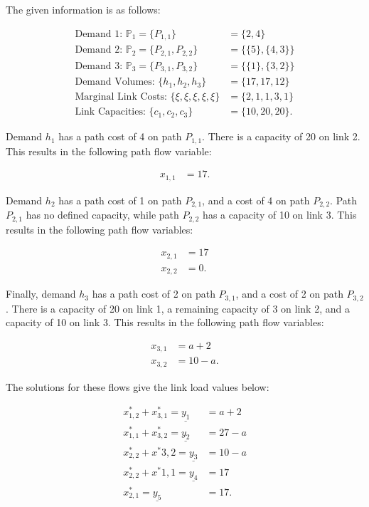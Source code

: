 The given information is as follows:

\begin{align*}
	\text{Demand 1: } \mathbb{P}_1 = \{P_{1,1}\} &= \{2,4\} \\
	\text{Demand 2: } \mathbb{P}_2 = \{P_{2,1}, P_{2,2}\} &=
	\{\{5\},\{4,3\}\} \\
	\text{Demand 3: } \mathbb{P}_3 = \{P_{3,1}, P_{3,2}\} &=
	\{\{1\},\{3,2\}\} \\
	\text{Demand Volumes: } \{h_1,h_2,h_3\} &= \{17,17,12\} \\
	\text{Marginal Link Costs: } \{\xi,\xi,\xi,\xi,\xi\}
	&= \{2,1,1,3,1\} \\
	\text{Link Capacities: } \{c_1,c_2,c_3\} &= \{10,20,20\}
.\end{align*}

Demand $h_1$ has a path cost of 4 on path $P_{1,1}$. There is a
capacity of 20 on link 2. This results in the following path flow variable:

 \begin{align*}
	 x_{1,1} &=17
.\end{align*}

Demand $h_2$ has a path cost of 1 on path $P_{2,1}$, and a cost of 4 on path
$P_{2,2}$. Path $P_{2,1}$ has no defined capacity, while path $P_{2,2}$ has
a capacity of 10 on link 3. This results in the following path flow variables:

\begin{align*}
	x_{2,1} &= 17 \\
	x_{2,2} &= 0
.\end{align*}

Finally, demand $h_3$ has a path cost of 2 on path $P_{3,1}$, and a cost of 2 on
path  $P_{3,2}$. There is a capacity of 20 on link 1, a remaining capacity of 3
on link 2, and a capacity of 10 on link 3. This results in the following path flow variables:

 \begin{align*}
	 x_{3,1} &= a+2 \\
	 x_{3,2} &= 10-a
.\end{align*}

The solutions for these flows give the link load values below:

\begin{align*}
	x^*_{1,2} + x^*_{3,1} = \underline{y_1} &= a+2 \\
	x^*_{1,1} + x^*_{3,2} = \underline{y_2} &= 27-a \\
	x^*_{2,2} + x^*{3,2} = \underline{y_3} &= 10-a \\
	x^*_{2,2} + x^*{1,1} = \underline{y_4} &= 17 \\
	x^*_{2,1} = \underline{y_5} &= 17
.\end{align*}

